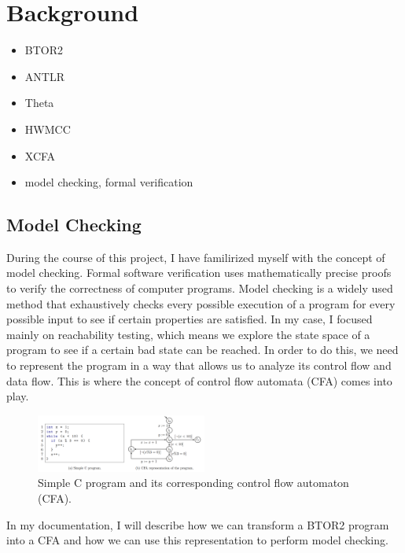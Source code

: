 \chapter{Background}

\begin{itemize}
  \item BTOR2
  \item ANTLR
  \item Theta
  \item HWMCC
  \item XCFA
  \item model checking, formal verification
\end{itemize}

\section{Model Checking}
During the course of this project, I have familirized myself with the concept of model checking. 
Formal software verification uses mathematically precise proofs to verify the correctness of computer programs. Model checking is a widely used method that exhaustively checks every possible execution of a program for every possible input to see if certain properties are satisfied.
In my case, I focused mainly on reachability testing, which means we explore the state space of a program to see if a certain bad state can be reached.
In order to do this, we need to represent the program in a way that allows us to analyze its control flow and data flow. This is where the concept of control flow automata (CFA) comes into play.
\begin{figure}[h]
  \centering
  \includegraphics[width=0.5\textwidth]{figures/cfa_c.png}
  \caption{Simple C program and its corresponding control flow automaton (CFA).}
\end{figure}
In my documentation, I will describe how we can transform a BTOR2 program into a CFA and how we can use this representation to perform model checking.

